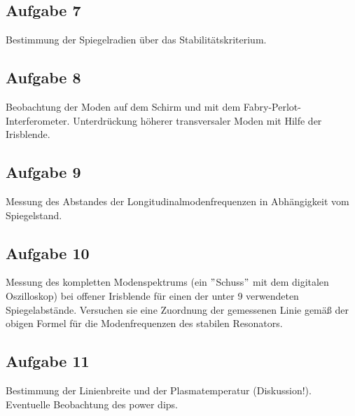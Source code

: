 \subsection*{Aufgabe 7}
Bestimmung der Spiegelradien über das Stabilitätskriterium.

\subsection*{Aufgabe 8}
Beobachtung der Moden auf dem Schirm und mit dem Fabry-Perlot-Interferometer. Unterdrückung höherer transversaler Moden mit Hilfe der Irisblende.

\subsection*{Aufgabe 9}
Messung des Abstandes der Longitudinalmodenfrequenzen  in Abhängigkeit vom Spiegelstand.

\subsection*{Aufgabe 10}
Messung des kompletten Modenspektrums (ein \("\)Schuss\("\) mit dem digitalen Oszilloskop) bei offener Irisblende für einen der unter 9 verwendeten Spiegelabstände. Versuchen sie eine Zuordnung der gemessenen Linie gemäß der obigen Formel für die Modenfrequenzen des stabilen Resonators.

\subsection*{Aufgabe 11}
Bestimmung der Linienbreite und der Plasmatemperatur (Diskussion!). Eventuelle Beobachtung des power dips.